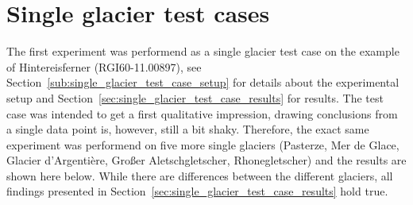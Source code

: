 
\chapter{Single glacier test cases}\label{appendix_A}
\thispagestyle{plain}

The first experiment was performend as a single glacier test case on the example of Hintereisferner (RGI60-11.00897), see Section~\ref{sub:single_glacier_test_case_setup} for details about the experimental setup and Section~\ref{sec:single_glacier_test_case_results} for results. The test case was intended to get a first qualitative impression, drawing conclusions from a single data point is, however, still a bit shaky. Therefore, the exact same experiment was performend on five more single glaciers (Pasterze, Mer de Glace, Glacier d'Argentière, Großer Aletschgletscher, Rhonegletscher) and the results are shown here below. While there are differences between the different glaciers, all findings presented in Section~\ref{sec:single_glacier_test_case_results} hold true.

